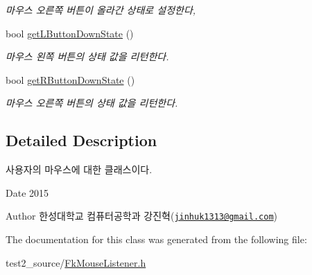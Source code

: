 \begin{DoxyCompactItemize}
\begin{DoxyCompactList}\small\item\em 마우스 오른쪽 버튼이 올라간 상태로 설정한다, \end{DoxyCompactList}\item 
\hypertarget{class_fk_mouse_a48db558a35c8f352b44346f4bcab6310}{}bool \hyperlink{class_fk_mouse_a48db558a35c8f352b44346f4bcab6310}{get\+L\+Button\+Down\+State} ()\label{class_fk_mouse_a48db558a35c8f352b44346f4bcab6310}

\begin{DoxyCompactList}\small\item\em 마우스 왼쪽 버튼의 상태 값을 리턴한다. \end{DoxyCompactList}\item 
\hypertarget{class_fk_mouse_a82519960ad67734d228bc3cbe93e4eec}{}bool \hyperlink{class_fk_mouse_a82519960ad67734d228bc3cbe93e4eec}{get\+R\+Button\+Down\+State} ()\label{class_fk_mouse_a82519960ad67734d228bc3cbe93e4eec}

\begin{DoxyCompactList}\small\item\em 마우스 오른쪽 버튼의 상태 값을 리턴한다. \end{DoxyCompactList}\end{DoxyCompactItemize}


\subsection{Detailed Description}
사용자의 마우스에 대한 클래스이다. 

\begin{DoxyDate}{Date}
2015 
\end{DoxyDate}
\begin{DoxyAuthor}{Author}
한성대학교 컴퓨터공학과 강진혁(\href{mailto:jinhuk1313@gmail.com}{\tt jinhuk1313@gmail.\+com}) 
\end{DoxyAuthor}


The documentation for this class was generated from the following file\+:\begin{DoxyCompactItemize}
\item 
test2\+\_\+source/\hyperlink{_fk_mouse_listener_8h}{Fk\+Mouse\+Listener.\+h}\end{DoxyCompactItemize}
